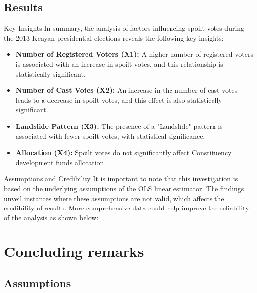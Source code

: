 \documentclass{beamer}
\begin{document}
\subsection{Results}

\begin{frame}{Key Insights}
In summary, the analysis of factors influencing spoilt votes during the 2013 Kenyan presidential elections reveals the following key insights:
\begin{itemize}
\item \textbf{Number of Registered Voters (X1):} A higher number of registered voters is associated with an increase in spoilt votes, and this relationship is statistically significant.
    
\item \textbf{Number of Cast Votes (X2):} An increase in the number of cast votes leads to a decrease in spoilt votes, and this effect is also statistically significant.
    
\item \textbf{Landslide Pattern (X3):} The presence of a "Landslide" pattern is associated with fewer spoilt votes, with statistical significance.
    
\item \textbf{Allocation (X4):} Spoilt votes do not significantly affect Constituency development funds allocation.
\end{itemize}
\end{frame}


\begin{frame}{Assumptions and Credibility}
It is important to note that this investigation is based on the underlying assumptions of the OLS linear estimator. The findings unveil instances where these assumptions are not valid, which affects the credibility of results. More comprehensive data could help improve the reliability of the analysis as shown below:
\end{frame}


\section{Concluding remarks}
\subsection{Assumptions}
\end{document}
